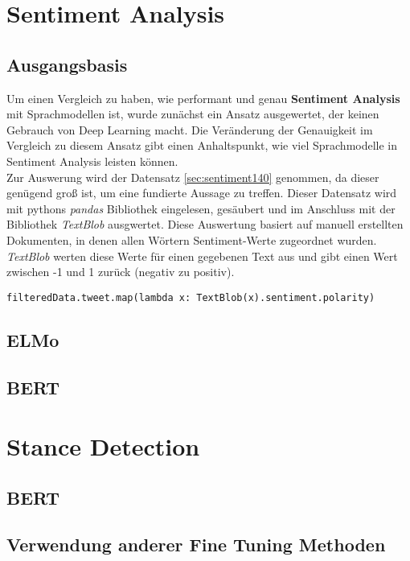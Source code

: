 \section{Sentiment Analysis}



\subsection{Ausgangsbasis}
Um einen Vergleich zu haben, wie performant und genau \textbf{Sentiment Analysis} mit Sprachmodellen ist, wurde zun\"achst ein Ansatz ausgewertet, der keinen Gebrauch von Deep Learning macht. Die Ver\"anderung der Genauigkeit im Vergleich zu diesem Ansatz gibt einen Anhaltspunkt, wie viel Sprachmodelle in Sentiment Analysis leisten k\"onnen.\\
Zur Auswerung wird der Datensatz \ref{sec:sentiment140} genommen, da dieser gen\"ugend gro{\ss} ist, um eine fundierte Aussage zu treffen. Dieser Datensatz wird mit pythons \textit{pandas} Bibliothek eingelesen, ges\"aubert und im Anschluss mit der Bibliothek \textit{TextBlob} ausgwertet. Diese Auswertung basiert auf manuell erstellten Dokumenten, in denen allen W\"ortern Sentiment-Werte zugeordnet wurden. \textit{TextBlob} werten diese Werte f\"ur einen gegebenen Text aus und gibt einen Wert zwischen -1 und 1 zur\"uck (negativ zu positiv).
\lstset{language=Python}
\lstset{frame=lines}
\lstset{captionpos=b}
\lstset{basicstyle=\footnotesize}
\begin{lstlisting}
filteredData.tweet.map(lambda x: TextBlob(x).sentiment.polarity)
\end{lstlisting}

\subsection{ELMo}

\subsection{BERT}



\section{Stance Detection}

\subsection{BERT}

\subsection{Verwendung anderer Fine Tuning Methoden}